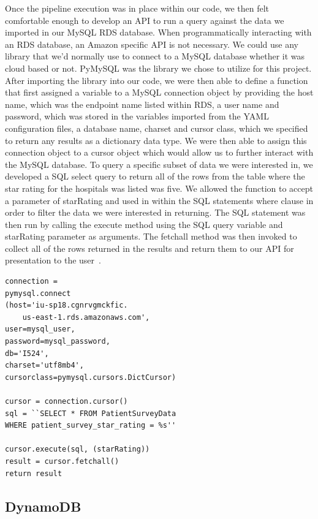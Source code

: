 Once the pipeline execution was in place within our code, we then felt 
comfortable enough to develop an API to run a query against the data we 
imported in our MySQL RDS database. When programmatically interacting with an 
RDS database, an Amazon specific API is not necessary. We could use any 
library that we'd normally use to connect to a MySQL database whether it was 
cloud based or not. PyMySQL was the library we chose to utilize for this 
project. After importing the library into our code, we were then able to 
define a function that first assigned a variable to a MySQL connection object 
by providing the host name, which was the endpoint name listed within RDS, a 
user name and password, which was stored in the variables imported from the 
YAML configuration files, a database name, charset and cursor class, which we 
specified to return any results as a dictionary data type. We were then able 
to assign this connection object to a cursor object which would allow us to 
further interact with the MySQL database. To query a specific subset of data 
we were interested in, we developed a SQL select query to return all of the 
rows from the table where the star rating for the hospitals was listed was 
five. We allowed the function to accept a parameter of starRating and used in 
within the SQL statements where clause in order to filter the data we were 
interested in returning. The SQL statement was then run by calling the execute 
method using the SQL query variable and starRating parameter as arguments. 
The fetchall method was then invoked to collect all of the rows returned in 
the results and return them to our API for presentation to the 
user~\cite{hid-sp18-521-pymysql}. 

\begin{verbatim}
connection =
pymysql.connect
(host='iu-sp18.cgnrvgmckfic.
	us-east-1.rds.amazonaws.com',
user=mysql_user,
password=mysql_password,
db='I524',
charset='utf8mb4',
cursorclass=pymysql.cursors.DictCursor)

cursor = connection.cursor()
sql = ``SELECT * FROM PatientSurveyData 
WHERE patient_survey_star_rating = %s''

cursor.execute(sql, (starRating))
result = cursor.fetchall()
return result
\end{verbatim}

\subsection{DynamoDB}

